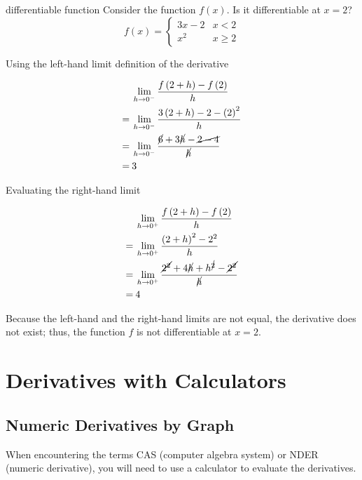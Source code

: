 \begin{example}{differentiable function}
    Consider the function \( f \left( x \right) \). Is it differentiable at \( x = 2 \)?
    \[
    f \left( x \right) = \begin{cases}
            3x - 2 & x < 2 \\
            x^2 & x \ge 2
        \end{cases}
    \]
    
    Using the left-hand limit definition of the derivative
    
    \begin{align}
        &\lim_{h \to 0^-} \dfrac{f \left( 2 + h \right) - f \left( 2 \right) }{h} \\
        = \> &\lim_{h \to 0^-} \dfrac{3 \left( 2 + h \right) - 2 - \left( 2 \right)^2}{h} \\
        = \> &\lim_{h \to 0^-} \dfrac{\cancel{6} + 3\cancel{h} - \cancel{2 - 4}}{\cancel{h}} \\
        = \> &3
    \end{align}
    
    Evaluating the right-hand limit
    
    \begin{align}
        &\lim_{h \to 0^+} \dfrac{f \left(2 + h \right) - f \left( 2 \right)}{h} \\
        = \> &\lim_{h \to 0^+} \dfrac{\left( 2 + h \right)^2 - 2^2}{h} \\
        = \> &\lim_{h \to 0^+} \dfrac{\cancel{2^2} + 4\cancel{h} + h^{\cancel{2}} - \cancel{2^2}}{\cancel{h}} \\
        = \> &4
    \end{align}
    
    Because the left-hand and the right-hand limits are not equal, the derivative does not exist; thus, the function \( f \) is not differentiable at \( x = 2 \).
\end{example}

\section{Derivatives with Calculators}

\subsection{Numeric Derivatives by Graph}

When encountering the terms CAS (computer algebra system) or NDER (numeric derivative), you will need to use a calculator to evaluate the derivatives. \par

